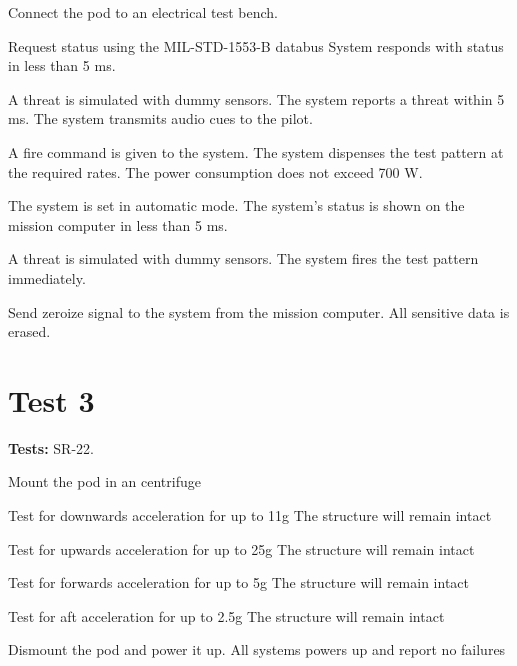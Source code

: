 \documentclass[Main]{subfiles}
\begin{document}
\begin{TestCaseIntro}
\end{TestCaseIntro}
\vspace{-20pt}
\begin{TestCase}
\TC
{Connect the pod to an electrical test bench.}
{}

\TC
{Request status using the MIL-STD-1553-B databus}
{System responds with status in less than 5 ms.}

\TC
{A threat is simulated with dummy sensors.}
{The system reports a threat within 5 ms.
The system transmits audio cues to the pilot.}


\TC
{A fire command is given to the system.}
{The system dispenses the test pattern at the required rates.
The power consumption does not exceed 700 W.}

\TC
{The system is set in automatic mode.}
{The system's status is shown on the mission computer in less than 5 ms.}

\TC
{A threat is simulated with dummy sensors.}
{The system fires the test pattern immediately.}


\TC
{Send zeroize signal to the system from the mission computer.}
{All sensitive data is erased.}
\end{TestCase}


\newpage
\section{Test 3}
\textbf{Tests: } SR-22.


\begin{TestCaseIntro}
\end{TestCaseIntro}

\begin{TestCase}
\TC
{Mount the pod in an centrifuge}
{}

\TC
{Test for downwards acceleration for up to 11g}
{The structure will remain intact}

\TC
{Test for upwards acceleration for up to 25g}
{The structure will remain intact}

\TC
{Test for forwards acceleration for up to 5g}
{The structure will remain intact}

\TC
{Test for aft acceleration for up to 2.5g}
{The structure will remain intact}

\TC
{Dismount the pod and power it up.}
{All systems powers up and report no failures}

\end{TestCase}
\end{document}
